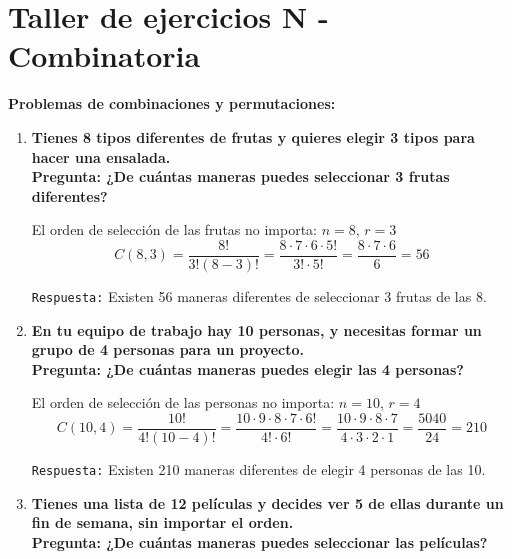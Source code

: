 \documentclass[12pt]{article}
\begin{document}
    

    \section*{\centering  Taller de ejercicios N - Combinatoria} 
    \vspace{0.5cm}\textbf{Problemas de combinaciones y permutaciones:} \vspace{0.5cm}

    \begin{enumerate}[label=\textbf{\arabic*.}]
        \item \textbf{Tienes 8 tipos diferentes de frutas y quieres elegir 3 tipos para hacer una
        ensalada.\\
        Pregunta: ¿De cuántas maneras puedes seleccionar 3 frutas diferentes?}

        El orden de selección de las frutas no importa: $n = 8$, $r = 3$\\

        \[C(8, 3) = \frac{8!}{3!(8 - 3)!} = \frac{8\cdot 7\cdot 6\cdot 5!}{3!\cdot 5!} =  \frac{8\cdot 7\cdot 6}{6} = 56\]

        \texttt{Respuesta:} Existen 56 maneras diferentes de seleccionar 3 frutas de las 8.



        \item \textbf{En tu equipo de trabajo hay 10 personas, y necesitas formar un grupo de 4
        personas para un proyecto.\\
        Pregunta: ¿De cuántas maneras puedes elegir las 4 personas?}

        El orden de selección de las personas no importa: $n = 10$, $r = 4$\\

        \[C(10, 4) = \frac{10!}{4!(10 - 4)!} = \frac{10\cdot 9\cdot 8\cdot 7\cdot 6!}{4!\cdot 6!} =  \frac{10\cdot 9\cdot 8\cdot 7}{4\cdot 3\cdot 2\cdot 1} 
        = \frac{5040}{24} = 210\]

        \texttt{Respuesta:} Existen 210 maneras diferentes de elegir 4 personas de las 10.
        


        \item \textbf{Tienes una lista de 12 películas y decides ver 5 de ellas durante un fin de
        semana, sin importar el orden.\\
        Pregunta: ¿De cuántas maneras puedes seleccionar las películas?}


\end{enumerate}
\end{document}
